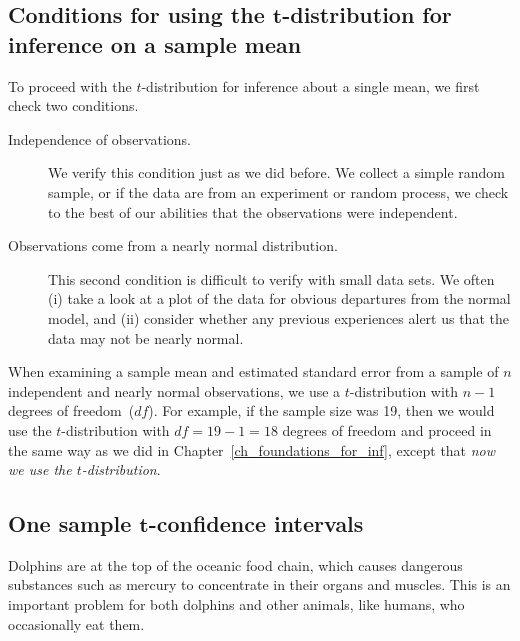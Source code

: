 

\subsection{Conditions for using the $\mathbf{t}$-distribution
    for inference on a sample mean}
\label{tDistSolutionToSEProblem}

\noindent%
To proceed with the $t$-distribution for inference about a single mean, we first check two conditions.
\begin{description}
\item[Independence of observations.]
    We verify this condition just as we did before.
    We collect a simple random sample, or if the data are from an experiment or random process, we check to the best of our abilities that the observations were independent.
\item[Observations come from a nearly normal distribution.]
    This second condition is difficult to verify with small data sets.
    We often (i) take a look at a plot of the data for obvious departures from the normal model, and (ii) consider whether any previous experiences alert us that the data may not be nearly normal.
\end{description}
When examining a sample mean and estimated standard error from a sample of $n$ independent and nearly normal observations, we use a $t$-distribution with $n-1$ degrees of freedom~($df$).
For example, if the sample size was 19, then we would use the $t$-distribution with $df=19-1=18$ degrees of freedom and proceed in the same way as we did in Chapter~\ref{ch_foundations_for_inf}, except that \emph{now we use the $t$-distribution}.


\subsection{One sample $\mathbf{t}$-confidence intervals}
\label{oneSampleTConfidenceIntervals}


Dolphins are at the top of the oceanic food chain, which causes dangerous substances such as mercury to concentrate in their organs and muscles. This is an important problem for both dolphins and other animals, like humans, who occasionally eat them.
\setlength{\captionwidth}{86mm}

